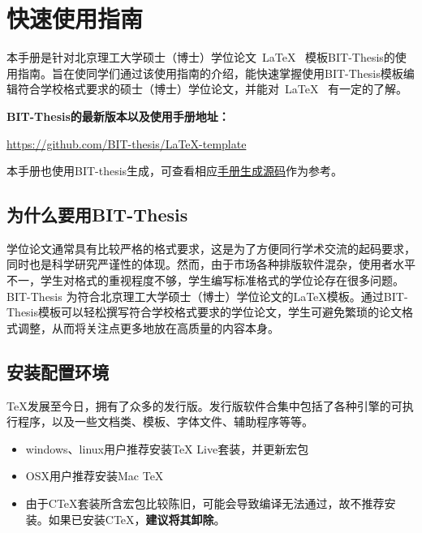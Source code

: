 
\chapter{快速使用指南}
\label{chap:what}

本手册是针对北京理工大学硕士（博士）学位论文~\LaTeX~ 模板BIT-Thesis的使用指南。旨在使同学们通过该使用指南的介绍，能快速掌握使用BIT-Thesis模板编辑符合学校格式要求的硕士（博士）学位论文，并能对~\LaTeX~ 有一定的了解。

\textbf{BIT-Thesis的最新版本以及使用手册地址：}
\begin{center}
\url{https://github.com/BIT-thesis/LaTeX-template}
\end{center}

本手册也使用BIT-thesis生成，可查看相应\href{https://github.com/BIT-thesis/LaTeX-template/tree/master/BIT-thesis-manual}{手册生成源码}作为参考。

\section{为什么要用BIT-Thesis}
\label{sec:why}
学位论文通常具有比较严格的格式要求，这是为了方便同行学术交流的起码要求，同时也是科学研究严谨性的体现。然而，由于市场各种排版软件混杂，使用者水平不一，学生对格式的重视程度不够，学生编写标准格式的学位论存在很多问题。BIT-Thesis 为符合北京理工大学硕士（博士）学位论文的LaTeX模板。通过BIT-Thesis模板可以轻松撰写符合学校格式要求的学位论文，学生可避免繁琐的论文格式调整，从而将关注点更多地放在高质量的内容本身。

\section{安装配置环境}
\label{sec:requirements}

\TeX 发展至今日，拥有了众多的发行版。发行版软件合集中包括了各种引擎的可执行程序，以及一些文档类、模板、字体文件、辅助程序等等。

\begin{itemize}
\item windows、linux用户推荐安装TeX Live套装，并更新宏包
\item OSX用户推荐安装Mac TeX
\item 由于CTeX套装所含宏包比较陈旧，可能会导致编译无法通过，故不推荐安装。如果已安装CTeX，\textbf{建议将其卸除}。
\end{itemize}

